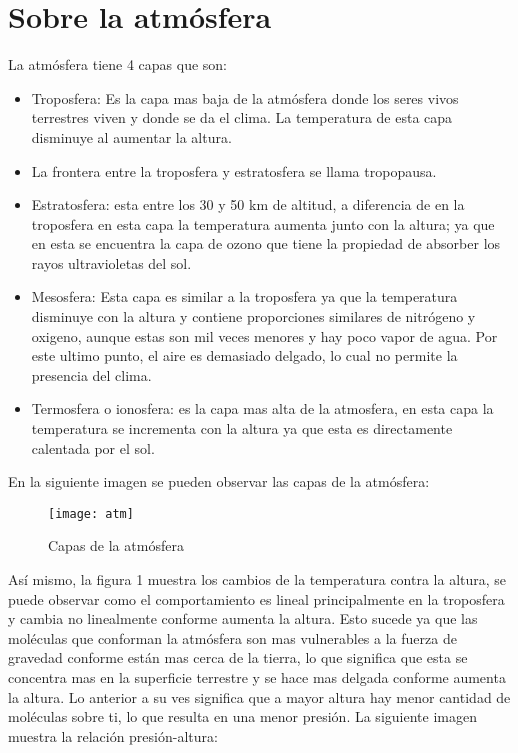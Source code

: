 \documentclass[12pt,letterpaper]{article}
\begin{document}
\section{Sobre la atmósfera}

La atmósfera tiene 4 capas que son\cite{a}:

\begin{itemize}
\item Troposfera: Es la capa mas baja de la atmósfera donde los seres vivos terrestres viven y donde se da el clima. La temperatura de esta capa disminuye al aumentar la altura. 
\item La frontera entre la troposfera y estratosfera se llama tropopausa. 
\item Estratosfera: esta entre los 30 y 50 km de altitud, a diferencia de en la troposfera en esta capa la temperatura aumenta junto con la altura; ya que en esta se encuentra la capa de ozono que tiene la propiedad de absorber los rayos ultravioletas del sol.
\item Mesosfera: Esta capa es similar a la troposfera ya que la temperatura disminuye con la altura y contiene proporciones similares de nitrógeno y oxigeno, aunque estas son mil veces menores y hay poco vapor de agua. Por este ultimo punto, el aire es demasiado delgado, lo cual no permite la presencia del clima.
\item  Termosfera o ionosfera: es la capa mas alta de la atmosfera, en esta capa la temperatura se incrementa con la altura ya que esta es directamente calentada por el sol.
\end{itemize}

En la siguiente imagen se pueden observar las capas de la atmósfera:

\begin{figure}[H]
	\centering
	\texttt{[image: atm]}
	\caption{Capas de la atmósfera \cite{a}}
\end{figure}

Así mismo, la figura 1 muestra los cambios de la temperatura contra la altura, se puede observar como el comportamiento es lineal principalmente en la troposfera y cambia no linealmente conforme aumenta la altura. Esto sucede ya que las moléculas que conforman la atmósfera son mas vulnerables a la fuerza de gravedad conforme están mas cerca de la tierra, lo que significa que esta se concentra mas en la superficie terrestre y se hace mas delgada conforme aumenta la altura\cite{a}. Lo anterior a su ves significa que a mayor altura hay menor cantidad de moléculas sobre ti, lo que resulta en una menor presión\cite{a}. La siguiente imagen muestra la relación presión-altura:\\
\end{document}
